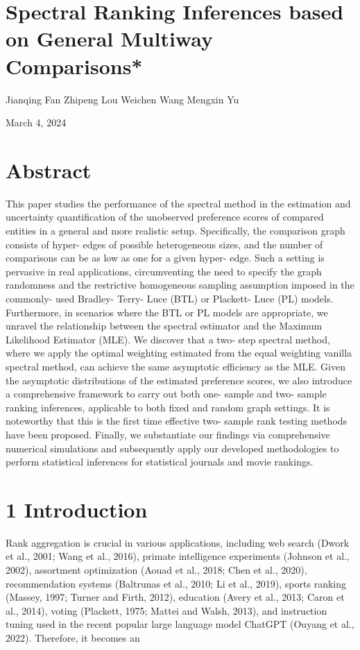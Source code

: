 


\section{Spectral Ranking Inferences based on General Multiway
Comparisons*}\label{spectral-ranking-inferences-based-on-general-multiway-comparisons}

Jianqing Fan Zhipeng Lou Weichen Wang Mengxin Yu

March 4, 2024

\section{Abstract}\label{abstract}

This paper studies the performance of the spectral method in the
estimation and uncertainty quantification of the unobserved preference
scores of compared entities in a general and more realistic setup.
Specifically, the comparison graph consists of hyper- edges of possible
heterogeneous sizes, and the number of comparisons can be as low as one
for a given hyper- edge. Such a setting is pervasive in real
applications, circumventing the need to specify the graph randomness and
the restrictive homogeneous sampling assumption imposed in the commonly-
used Bradley- Terry- Luce (BTL) or Plackett- Luce (PL) models.
Furthermore, in scenarios where the BTL or PL models are appropriate, we
unravel the relationship between the spectral estimator and the Maximum
Likelihood Estimator (MLE). We discover that a two- step spectral
method, where we apply the optimal weighting estimated from the equal
weighting vanilla spectral method, can achieve the same asymptotic
efficiency as the MLE. Given the asymptotic distributions of the
estimated preference scores, we also introduce a comprehensive framework
to carry out both one- sample and two- sample ranking inferences,
applicable to both fixed and random graph settings. It is noteworthy
that this is the first time effective two- sample rank testing methods
have been proposed. Finally, we substantiate our findings via
comprehensive numerical simulations and subsequently apply our developed
methodologies to perform statistical inferences for statistical journals
and movie rankings.

\section{1 Introduction}\label{introduction}

Rank aggregation is crucial in various applications, including web
search (Dwork et al., 2001; Wang et al., 2016), primate intelligence
experiments (Johnson et al., 2002), assortment optimization (Aouad et
al., 2018; Chen et al., 2020), recommendation systems (Baltrunas et al.,
2010; Li et al., 2019), sports ranking (Massey, 1997; Turner and Firth,
2012), education (Avery et al., 2013; Caron et al., 2014), voting
(Plackett, 1975; Mattei and Walsh, 2013), and instruction tuning used in
the recent popular large language model ChatGPT (Ouyang et al., 2022).
Therefore, it becomes an

